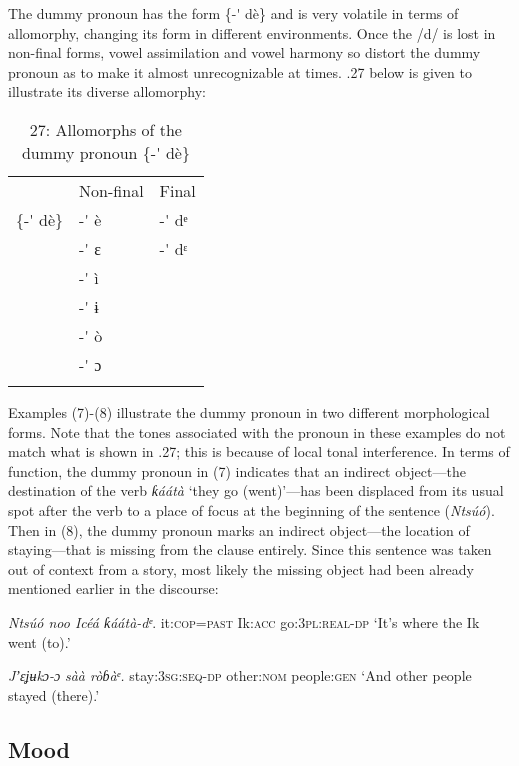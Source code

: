 The dummy pronoun has the form \{-\'{} dè\} and is very volatile in terms of allomorphy, changing its form in different environments. Once the /d/ is lost in non-final forms, vowel assimilation and vowel harmony so distort the dummy pronoun as to make it almost unrecognizable at times. .27 below is given to illustrate its diverse allomorphy:


\begin{table}
\caption{27: Allomorphs of the dummy pronoun \{-\'{} dè\}}
\label{tab:8}


\begin{tabularx}{\textwidth}{XXX} & Non-final & Final\\
\lsptoprule
\{-\'{} dè\} & {}-\'{} è & {}-\'{} dᵉ\\
& {}-\'{} ɛ & {}-\'{} dᵋ\\
& {}-\'{} ì & \\
& {}-\'{} ɨ & \\
& {}-\'{} ò & \\
& {}-\'{} ɔ & \\
\lspbottomrule
\end{tabularx}
\end{table}
Examples (7)-(8) illustrate the dummy pronoun in two different morphological forms. Note that the tones associated with the pronoun in these examples do not match what is shown in .27; this is because of local tonal interference. In terms of function, the dummy pronoun in (7) indicates that an indirect object—the destination of the verb \textit{ƙáátà} ‘they go (went)’—has been displaced from its usual spot after the verb to a place of focus at the beginning of the sentence (\textit{Ntsúó}). Then in (8), the dummy pronoun marks an indirect object—the location of staying—that is missing from the clause entirely. Since this sentence was taken out of context from a story, most likely the missing object had been already mentioned earlier in the discourse:




\textit{Ntsúó noo     Icéá     ƙáátà-}\textit{dᵉ}.
it:\textsc{cop}=\textsc{past}    Ik:\textsc{acc}   go:\textsc{3pl:real-dp}
‘It’s where the Ik went (to).’




\textit{Jʼɛʝʉkɔ-}\textit{ɔ}\textit{     sàà     ròɓàᵉ.}
stay:\textsc{3sg:seq-dp}   other:\textsc{nom}   people:\textsc{gen}
‘And other people stayed (there).’






\subsection{Mood}
